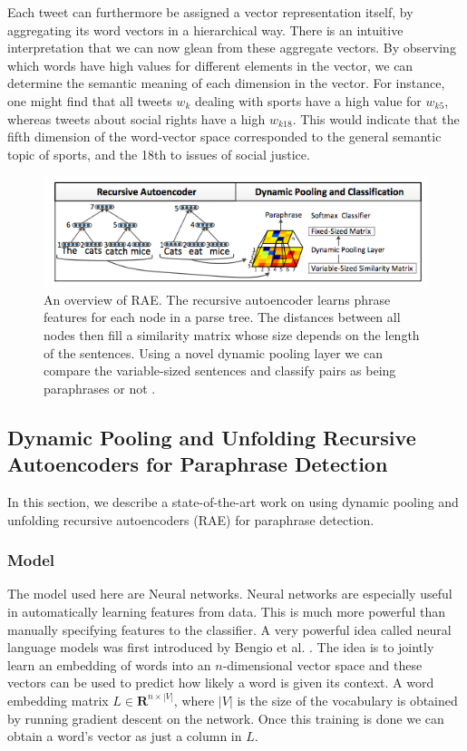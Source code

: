\documentclass[conference]{IEEEtran}
\begin{document}
\indent Each tweet can furthermore be assigned a vector representation itself, by aggregating its word vectors in a hierarchical way.  There is an intuitive interpretation that we can now glean from these aggregate vectors.  By observing which words have high values for different elements in the vector, we can determine the semantic meaning of each dimension in the vector. For instance, one might find that all tweets $w_k$ dealing with sports have a high value for $w_{k5}$, whereas tweets about social rights have a high $w_{k18}$. This would indicate that the fifth dimension of the word-vector space corresponded to the general semantic topic of sports, and the 18th to issues of social justice.\\

\begin{figure}
	\centering
	\includegraphics[scale=0.7]{RAE.png}
	\caption{An overview of RAE. The recursive autoencoder learns phrase features
for each node in a parse tree. The distances between all nodes then fill a similarity matrix whose
size depends on the length of the sentences. Using a novel dynamic pooling layer we can compare
the variable-sized sentences and classify pairs as being paraphrases or not \cite{richard}.}
	\label{fig1}
\end{figure}

\subsection{Dynamic Pooling and Unfolding Recursive Autoencoders for Paraphrase Detection}
In this section, we describe a state-of-the-art work \cite{richard} on using dynamic pooling and unfolding recursive autoencoders (RAE) for paraphrase detection.\\
\subsubsection{Model}
The model used here are Neural networks. Neural networks are especially useful in automatically learning features from data. This is much more powerful than manually specifying features to the classifier. A very powerful idea called neural language models was first introduced by Bengio et al. \cite{bengio}. The idea is to jointly learn an embedding of words into an $n$-dimensional vector space and these vectors can be used to predict how likely a word is given its context. A word embedding matrix $L \in \mathbf{R}^{n \times |V|}$, where $|V|$ is the size of the vocabulary is obtained by running gradient descent on the network. Once this training is done we can obtain a word's vector as just a column in $L$.\\
\end{document}
